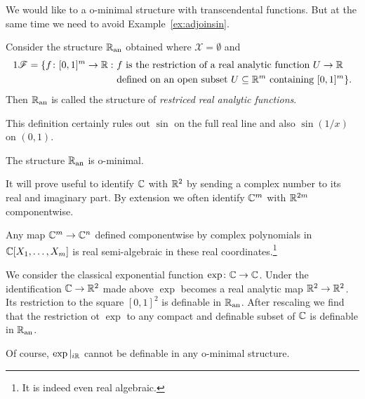 We would like to a o-minimal structure with transcendental functions.
But at the same time we need to avoid  Example~\ref{ex:adjoinsin}.

\begin{definition}
  Consider the structure ${{\mathbb{R}}_{\mathrm{an}}}$ obtained where $\mathscr{X} = \emptyset$ and
  \begin{alignat*}1
    \mathscr{F} = \{f \colon [0,1]^m\rightarrow\IR:  \,\,&\text{$f$ is the
      restriction of a real analytic function $U\rightarrow \IR$}\\
    &\text{defined on an open subset
      $U\subset\IR^m$ containing $[0,1]^m$}\}.  
  \end{alignat*}
  Then ${{\mathbb{R}}_{\mathrm{an}}}$ is called the structure of \emph{restriced real analytic functions}.
\end{definition}

This definition certainly rules out $\sin$ on the full real line and
also $\sin(1/x)$ on $(0,1)$. 

\begin{theorem}
  The structure ${{\mathbb{R}}_{\mathrm{an}}}$ is o-minimal. 
\end{theorem}

\begin{convention}
  \label{conv:identCCRR2}
  It will prove useful to identify ${\mathbb{C}}$ with ${\mathbb{R}}^2$ by sending a
  complex number to its real and imaginary part. By extension we often
  identify ${\mathbb{C}}^m$ with ${\mathbb{R}}^{2m}$ componentwise.

  Any  map ${\mathbb{C}}^m\rightarrow {\mathbb{C}}^n$ defined componentwise by complex polynomials in
  ${\mathbb{C}}[X_1,\ldots,X_m]$
  is real semi-algebraic in these real coordinates.\footnote{It is
    indeed even real algebraic.}
\end{convention}

\begin{example}
  We consider the classical exponential function
  $\exp\colon{\mathbb{C}}\rightarrow{\mathbb{C}}$.  Under the identification
  ${\mathbb{C}}\rightarrow{\mathbb{R}}^2$ made above
  $\exp$ becomes a real analytic map
  ${\mathbb{R}}^2\rightarrow{\mathbb{R}}^2$.
  Its restriction to the square $[0,1]^2$ is definable in ${{\mathbb{R}}_{\mathrm{an}}}$.
  After rescaling we find that the restriction ot $\exp$ to any
  compact and definable subset of ${\mathbb{C}}$ is definable in ${{\mathbb{R}}_{\mathrm{an}}}$.

  Of course, $\exp|_{i{\mathbb{R}}}$ cannot be definable in any o-minimal
  structure. 
\end{example}

